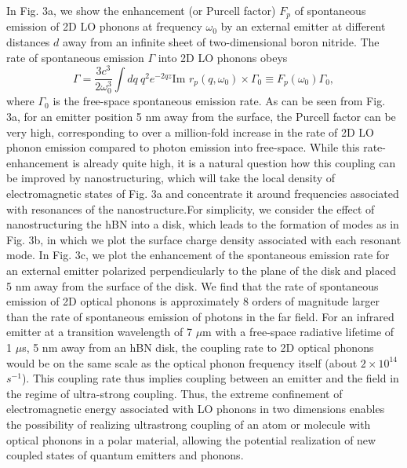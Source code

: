 \documentclass[aps,prb,twocolumn,
	groupedaddress,superscriptaddress,
	amsfonts,amssymb,amsmath,floatfix,
	citeautoscript]{revtex4-1}
\begin{document}
In Fig. 3a, we show the enhancement (or Purcell factor) $F_p$ of spontaneous emission of 2D LO phonons at frequency $\omega_0$ by an external emitter at different distances $d$ away from an infinite sheet of two-dimensional boron nitride. The rate of spontaneous emission $\Gamma$ into 2D LO phonons obeys
\begin{equation}
\Gamma = \frac{3c^3}{2\omega_0^3}\int dq~q^2e^{-2qz}\text{Im }r_p(q,\omega_0) \times \Gamma_0 \equiv F_p(\omega_0)\Gamma_0,
\end{equation}
where $\Gamma_0$ is the free-space spontaneous emission rate. As can be seen from Fig. 3a, for an emitter position 5 nm away from the surface, the Purcell factor can be very high, corresponding to over a million-fold increase in the rate of 2D LO phonon emission compared to photon emission into free-space. While this rate-enhancement is already quite high, it is a natural question how this coupling can be improved by nanostructuring, which will take the local density of electromagnetic states of Fig. 3a and concentrate it around frequencies associated with resonances of the nanostructure.For simplicity, we consider the effect of nanostructuring the hBN into a disk, which leads to the formation of modes as in Fig. 3b, in which we plot the surface charge density associated with each resonant mode. In Fig. 3c, we plot the enhancement of the spontaneous emission rate for an external emitter polarized perpendicularly to the plane of the disk and placed 5 nm away from the surface of the disk. We find that the rate of spontaneous emission of 2D optical phonons is approximately 8 orders of magnitude larger than the rate of spontaneous emission of photons in the far field. For an infrared emitter at a transition wavelength of 7 $\mu$m with a free-space radiative lifetime of 1 $\mu$s, 5 nm away from an hBN disk, the coupling rate to 2D optical phonons would be on the same scale as the optical phonon frequency itself (about $2 \times 10^{14}$ $ s^{-1}$). This coupling rate thus implies coupling between an emitter and the field in the regime of ultra-strong coupling. Thus, the extreme confinement of electromagnetic energy associated with LO phonons in two dimensions enables the possibility of realizing ultrastrong coupling of an atom or molecule with optical phonons in a polar material, allowing the potential realization of new coupled states of quantum emitters and phonons.
\end{document}
